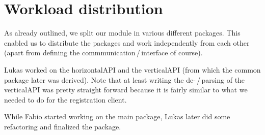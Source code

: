 \documentclass[a4paper,english,10pt,NET]{tumarticle}
\begin{document}
\section{Workload distribution}
As already outlined, we split our module in various different packages.
This enabled us to distribute the packages and work independently from each other (apart from defining the commmunication\,/\,interface of course).


Lukas worked on the horizontalAPI and the verticalAPI (from which the common package later was derived).
Note that at least writing the de-\,/\,parsing of the verticalAPI was pretty straight forward because it is fairly similar to what we needed to do for the registration client.

While Fabio started working on the main package, Lukas later did some refactoring and finalized the package.


\todos
\end{document}
